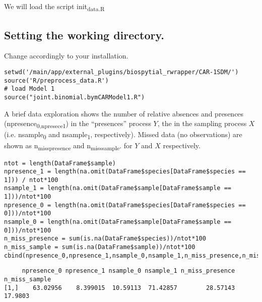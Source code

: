 \documentclass[11pt]{article}
\begin{document}
We will load the script init\textsubscript{data.R}

\subsection{Setting the working directory.}
\label{sec:orgdf01878}
Change accordingly to your installation.

\begin{verbatim}
setwd('/main/app/external_plugins/biospytial_rwrapper/CAR-1SDM/')
source('R/preprocess_data.R')
# load Model 1
source("joint.binomial.bymCARModel1.R")
\end{verbatim}

A brief data exploration shows the number of relative absences and presences (npresence\textsubscript{0,npresece}\textsubscript{1}) in the ``presences'' process \(Y\), the in the sampling process \(X\)  (i.e. nsample\textsubscript{0} and nsample\textsubscript{1}, respectively). Missed data (no observations) are shown as n\textsubscript{miss}\textsubscript{presence} and n\textsubscript{miss}\textsubscript{sample}. for \(Y\) and \(X\) respectively.

\begin{verbatim}
ntot = length(DataFrame$sample)
npresence_1 = length(na.omit(DataFrame$species[DataFrame$species == 1])) / ntot*100
nsample_1 = length(na.omit(DataFrame$sample[DataFrame$sample == 1]))/ntot*100
npresence_0 = length(na.omit(DataFrame$species[DataFrame$species == 0]))/ntot*100
nsample_0 = length(na.omit(DataFrame$sample[DataFrame$sample == 0]))/ntot*100
n_miss_presence = sum(is.na(DataFrame$species))/ntot*100
n_miss_sample = sum(is.na(DataFrame$sample))/ntot*100
cbind(npresence_0,npresence_1,nsample_0,nsample_1,n_miss_presence,n_miss_sample)
\end{verbatim}

\begin{verbatim}
     npresence_0 npresence_1 nsample_0 nsample_1 n_miss_presence n_miss_sample
[1,]    63.02956    8.399015  10.59113  71.42857        28.57143       17.9803
\end{verbatim}
\end{document}
